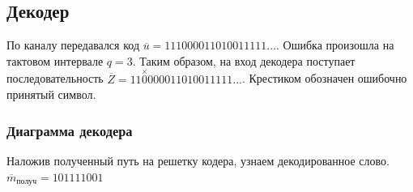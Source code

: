 \documentclass[a4paper, 12pt]{article}
\begin{document}
\subsection{Декодер}
По каналу передавался код 
\(\overline{u}=11 10 00 01 10 10 01 11 11...\).
Ошибка произошла на тактовом интервале \(q=3\).
Таким образом, на вход декодера поступает последовательность 
\(\overline{Z}=11 \overset{\times}{0} 0 00 01 10 10 01 11 11...\). Крестиком обозначен ошибочно принятый символ.

\subsubsection{Диаграмма декодера}


Наложив полученный путь на решетку кодера, узнаем декодированное слово.
$\overline{m}_{получ}=101111001$
\end{document}
